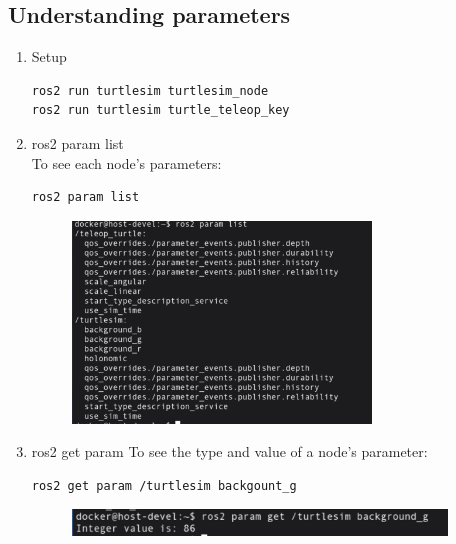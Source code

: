 \documentclass[12pt, a4paper]{article}
\begin{document}
\subsection{Understanding parameters}
\begin{enumerate}
	\item Setup
\begin{lstlisting}[language=bash]
ros2 run turtlesim turtlesim_node
ros2 run turtlesim turtle_teleop_key
\end{lstlisting}
\item ros2 param list\\
To see each node's parameters:
\begin{lstlisting}[language=bash]
ros2 param list
\end{lstlisting}
\begin{figure}[h]
	\centering
	\includegraphics[width=0.75\textwidth]{p1.6-1}
\end{figure}

\item ros2 get param
To see the type and value of a node's parameter:
\begin{lstlisting}[language=bash]
ros2 get param /turtlesim backgount_g
\end{lstlisting}
\begin{figure}[h]
	\setlength{\leftskip}{2.4em}
	\includegraphics[width=0.94\textwidth]{p1.6-2}
\end{figure}


\end{enumerate}
\end{document}
